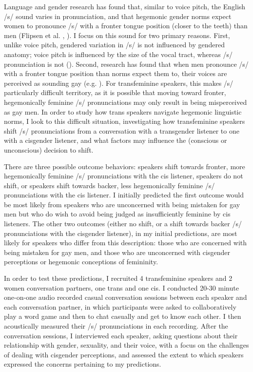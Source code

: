 \documentclass[12pt,twoside]{reedthesis}
\begin{document}
Language and gender research has found that, similar to voice pitch, the English /s/ sound varies in pronunciation, and that hegemonic gender norms expect women to pronounce /s/ with a fronter tongue position (closer to the teeth) than men (Flipsen et al. \cite*{flipsen_acoustic_1999}, \cite{hazenberg_language_2012, zimman_hegemonic_2013,podesva_sexuality_2015}). I focus on this sound for two primary reasons. First, unlike voice pitch, gendered variation in /s/ is not influenced by gendered anatomy; voice pitch is influenced by the size of the vocal tract, whereas /s/ pronunciation is not (\cite{zimman_variability_2017}). Second, research has found that when men pronounce /s/ with a fronter tongue position than norms expect them to, their voices are perceived as sounding gay (e.g. \cite{calder_sissy_2019}). For transfeminine speakers, this makes /s/ particularly difficult territory, as it is possible that moving toward fronter, hegemonically feminine /s/ pronunciations may only result in being misperceived as gay men. In order to study how trans speakers navigate hegemonic linguistic norms, I look to this difficult situation, investigating how transfeminine speakers shift /s/ pronunciations from a conversation with a transgender listener to one with a cisgender listener, and what factors may influence the (conscious or unconscious) decision to shift.

There are three possible outcome behaviors: speakers shift towards fronter, more hegemonically feminine /s/ pronunciations with the cis listener, speakers do not shift, or speakers shift towards backer, less hegemonically feminine /s/ pronunciations with the cis listener. I initially predicted the first outcome would be most likely from speakers who are unconcerned with being mistaken for gay men but who do wish to avoid being judged as insufficiently feminine by cis listeners. The other two outcomes (either no shift, or a shift towards backer /s/ pronunciations with the cisgender listener), in my initial predictions, are most likely for speakers who differ from this description: those who are concerned with being mistaken for gay men, and those who are unconcerned with cisgender perceptions or hegemonic conceptions of femininity.

In order to test these predictions, I recruited 4 transfeminine speakers and 2 women conversation partners, one trans and one cis. I conducted 20-30 minute one-on-one audio recorded casual conversation sessions between each speaker and each conversation partner, in which participants were asked to collaboratively play a word game and then to chat casually and get to know each other. I then acoustically measured their /s/ pronunciations in each recording. After the conversation sessions, I interviewed each speaker, asking questions about their relationship with gender, sexuality, and their voice, with a focus on the challenges of dealing with cisgender perceptions, and assessed the extent to which speakers expressed the concerns pertaining to my predictions.
\end{document}
